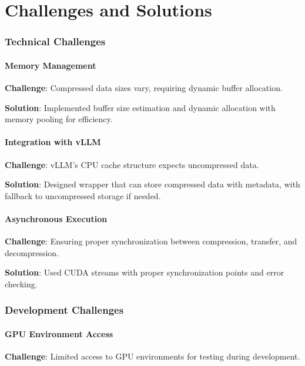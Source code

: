 \documentclass{polyu-comp}
\begin{document}
\chapter{Challenges and Solutions}

\subsection{Technical Challenges}

\subsubsection{Memory Management}

\textbf{Challenge}: Compressed data sizes vary, requiring dynamic buffer allocation.

\textbf{Solution}: Implemented buffer size estimation and dynamic allocation with memory pooling for efficiency.

\subsubsection{Integration with vLLM}

\textbf{Challenge}: vLLM's CPU cache structure expects uncompressed data.

\textbf{Solution}: Designed wrapper that can store compressed data with metadata, with fallback to uncompressed storage if needed.

\subsubsection{Asynchronous Execution}

\textbf{Challenge}: Ensuring proper synchronization between compression, transfer, and decompression.

\textbf{Solution}: Used CUDA streams with proper synchronization points and error checking.

\subsection{Development Challenges}

\subsubsection{GPU Environment Access}

\textbf{Challenge}: Limited access to GPU environments for testing during development.
\end{document}
